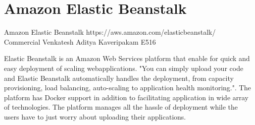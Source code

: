 \section{Amazon Elastic Beanstalk}

Amazon Elastic Beanstalk
https://aws.amazon.com/elasticbeanstalk/
Commercial
Venkatesh Aditya Kaveripakam
E516

Elastic Beanstalk is an Amazon Web Services platform that enable for quick
and easy deployment of scaling webapplications. "You can simply upload your
code and Elastic Beanstalk automatically handles the deployment, from
capacity provisioning, load balancing, auto-scaling to application health
monitoring."\cite{hid-sp18-411-amazonelasticbeanstalk}. The platform has
Docker support in addition to facilitating application in wide array of
technologies. The platform manages all the hassle of deployment while the
users have to just worry about uploading their applications.